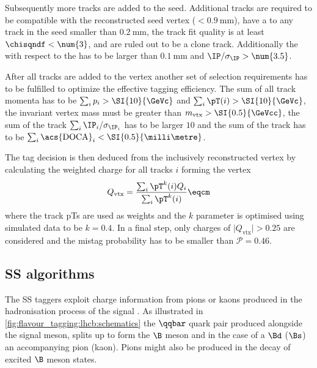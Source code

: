 Subsequently more tracks are added to the seed. Additional tracks are required
to be compatible with the reconstructed seed vertex
(\IP$<\SI{0.9}{\milli\metre}$), have a \DOCA to any track in the seed smaller
than $\SI{0.2}{\milli\metre}$, the track fit quality is at least
$\chisqndf<\num{3}$, and are ruled out to be a clone track. Additionally the \IP
with respect to the \PV has to be larger than $\SI{0.1}{\milli\metre}$ and
$\text{\IP}/\sigma_\text{\IP}>\num{3.5}$.

After all tracks are added to the vertex another set of selection requirements
has to be fulfilled to optimize the effective tagging efficiency. The sum of all
track momenta has to be $\sum_i p_i > \SI{10}{\GeVc}$ and $\sum_i \pT(i) >
\SI{10}{\GeVc}$, the invariant vertex mass must be greater than $m_\text{vtx} >
\SI{0.5}{\GeVcc}$, the sum of the track
$\sum_i\text{\IP}_i/\sigma_{\text{\IP}_i}$ has to be larger $\num{10}$ and the
sum of the track \DOCA has to be $\sum_i\text{\acs{DOCA}}_i <
\SI{0.5}{\milli\metre}$.

The tag decision is then deduced from the inclusively reconstructed vertex by
calculating the weighted charge for all tracks $i$ forming the vertex
%
\begin{equation}\label{eq:flavour_tagging:os:vertex:charge}
  Q_\text{vtx} = \frac{\sum_i \pT^k(i)Q_i}{\sum_i\pT^k(i)}\eqcm
\end{equation}
where the track \acp{pT} are used as weights and the $k$ parameter is optimised
using simulated data to be $k=\num{0.4}$. In a final step, only charges of
$\vert Q_\text{vtx} \vert > 0.25$ are considered and the mistag probability has
to be smaller than $\mathcal{P}=0.46$.

\subsection{\Acl{SS} algorithms}
\label{sec:flavour_tagging:ss}

The \acl{SS} taggers exploit charge information from pions or kaons produced in
the hadronisation process of the signal \Bmeson. As illustrated in
\cref{fig:flavour_tagging:lhcb:schematics} the $\qqbar$ quark pair produced
alongside the signal meson, splits up to form the $\B$ meson and in the case of
a $\Bd$ ($\Bs$) an accompanying pion (kaon). Pions might also be produced in the
decay of excited $\B$ meson states.

